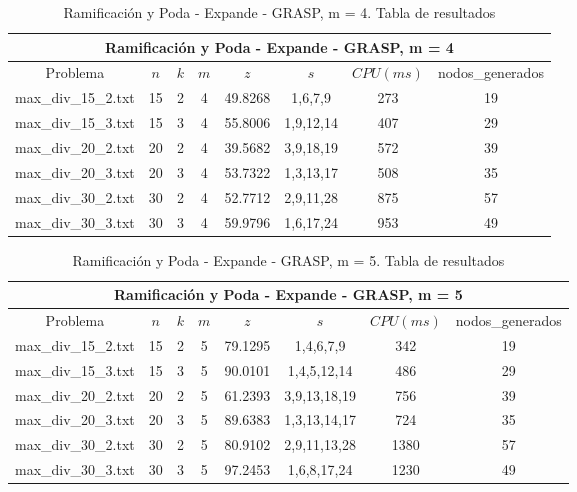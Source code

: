    \begin{table}[h]
   {\small
   \begin{center}
   \begin{tabular}{cccccccc}
      \multicolumn{8}{c}{Ramificación y Poda - Expande - GRASP, m = 4} \\
      \hline
      Problema & $n$ & $k$ & $m$ & $z$ & $s$ & $CPU(ms)$ & nodos\_generados \\
      \hline
      max\_div\_15\_2.txt & 15 & 2 & 4 & 49.8268 & 1,6,7,9 & 273 & 19 \\
      max\_div\_15\_3.txt & 15 & 3 & 4 & 55.8006 & 1,9,12,14 & 407 & 29 \\
      max\_div\_20\_2.txt & 20 & 2 & 4 & 39.5682 & 3,9,18,19 & 572 & 39 \\
      max\_div\_20\_3.txt & 20 & 3 & 4 & 53.7322 & 1,3,13,17 & 508 & 35 \\
      max\_div\_30\_2.txt & 30 & 2 & 4 & 52.7712 & 2,9,11,28 & 875 & 57 \\
      max\_div\_30\_3.txt & 30 & 3 & 4 & 59.9796 & 1,6,17,24 & 953 & 49 \\
      \hline
   \end{tabular}
   \end{center}
   }
   \caption{Ramificación y Poda - Expande - GRASP, m = 4. Tabla de resultados}
   \end{table}

   \begin{table}[h]
   {\small
   \begin{center}
   \begin{tabular}{cccccccc}
      \multicolumn{8}{c}{Ramificación y Poda - Expande - GRASP, m = 5} \\
      \hline
      Problema & $n$ & $k$ & $m$ & $z$ & $s$ & $CPU(ms)$ & nodos\_generados \\
      \hline
      max\_div\_15\_2.txt & 15 & 2 & 5 & 79.1295 & 1,4,6,7,9 & 342 & 19 \\
      max\_div\_15\_3.txt & 15 & 3 & 5 & 90.0101 & 1,4,5,12,14 & 486 & 29 \\
      max\_div\_20\_2.txt & 20 & 2 & 5 & 61.2393 & 3,9,13,18,19 & 756 & 39 \\
      max\_div\_20\_3.txt & 20 & 3 & 5 & 89.6383 & 1,3,13,14,17 & 724 & 35 \\
      max\_div\_30\_2.txt & 30 & 2 & 5 & 80.9102 & 2,9,11,13,28 & 1380 & 57 \\
      max\_div\_30\_3.txt & 30 & 3 & 5 & 97.2453 & 1,6,8,17,24 & 1230 & 49 \\
      \hline
   \end{tabular}
   \end{center}
   }
   \caption{Ramificación y Poda - Expande - GRASP, m = 5. Tabla de resultados}
   \end{table}

